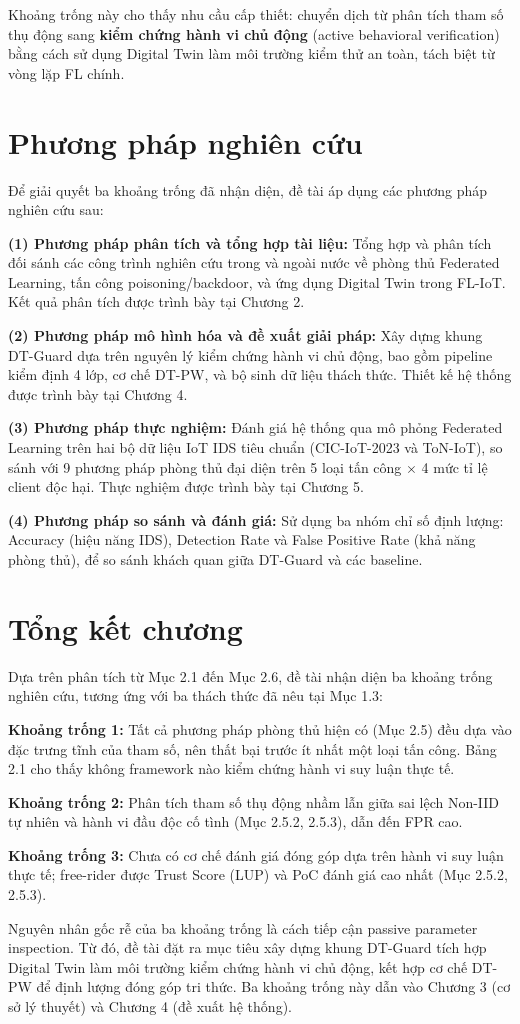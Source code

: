 Khoảng trống này cho thấy nhu cầu cấp thiết: chuyển dịch từ phân tích tham số thụ động sang \textbf{kiểm chứng hành vi chủ động} (active behavioral verification) bằng cách sử dụng Digital Twin làm môi trường kiểm thử an toàn, tách biệt từ vòng lặp FL chính.

\section{Phương pháp nghiên cứu}
Để giải quyết ba khoảng trống đã nhận diện, đề tài áp dụng các phương pháp nghiên cứu sau:

\textbf{(1) Phương pháp phân tích và tổng hợp tài liệu:} Tổng hợp và phân tích đối sánh các công trình nghiên cứu trong và ngoài nước về phòng thủ Federated Learning, tấn công poisoning/backdoor, và ứng dụng Digital Twin trong FL-IoT. Kết quả phân tích được trình bày tại Chương 2.

\textbf{(2) Phương pháp mô hình hóa và đề xuất giải pháp:} Xây dựng khung DT-Guard dựa trên nguyên lý kiểm chứng hành vi chủ động, bao gồm pipeline kiểm định 4 lớp, cơ chế DT-PW, và bộ sinh dữ liệu thách thức. Thiết kế hệ thống được trình bày tại Chương 4.

\textbf{(3) Phương pháp thực nghiệm:} Đánh giá hệ thống qua mô phỏng Federated Learning trên hai bộ dữ liệu IoT IDS tiêu chuẩn (CIC-IoT-2023 và ToN-IoT), so sánh với 9 phương pháp phòng thủ đại diện trên 5 loại tấn công $\times$ 4 mức tỉ lệ client độc hại. Thực nghiệm được trình bày tại Chương 5.

\textbf{(4) Phương pháp so sánh và đánh giá:} Sử dụng ba nhóm chỉ số định lượng: Accuracy (hiệu năng IDS), Detection Rate và False Positive Rate (khả năng phòng thủ), để so sánh khách quan giữa DT-Guard và các baseline.

\section{Tổng kết chương}
Dựa trên phân tích từ Mục 2.1 đến Mục 2.6, đề tài nhận diện ba khoảng trống nghiên cứu, tương ứng với ba thách thức đã nêu tại Mục 1.3:

\textbf{Khoảng trống 1:} Tất cả phương pháp phòng thủ hiện có (Mục 2.5) đều dựa vào đặc trưng tĩnh của tham số, nên thất bại trước ít nhất một loại tấn công. Bảng 2.1 cho thấy không framework nào kiểm chứng hành vi suy luận thực tế.

\textbf{Khoảng trống 2:} Phân tích tham số thụ động nhầm lẫn giữa sai lệch Non-IID tự nhiên và hành vi đầu độc cố tình (Mục 2.5.2, 2.5.3), dẫn đến FPR cao.

\textbf{Khoảng trống 3:} Chưa có cơ chế đánh giá đóng góp dựa trên hành vi suy luận thực tế; free-rider được Trust Score (LUP) và PoC đánh giá cao nhất (Mục 2.5.2, 2.5.3).

Nguyên nhân gốc rễ của ba khoảng trống là cách tiếp cận passive parameter inspection. Từ đó, đề tài đặt ra mục tiêu xây dựng khung DT-Guard tích hợp Digital Twin làm môi trường kiểm chứng hành vi chủ động, kết hợp cơ chế DT-PW để định lượng đóng góp tri thức. Ba khoảng trống này dẫn vào Chương 3 (cơ sở lý thuyết) và Chương 4 (đề xuất hệ thống).
